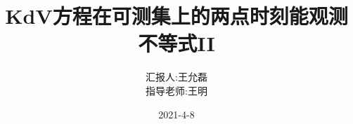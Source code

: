 \documentclass[xcolor=svgnames,serif,table,10pt]{beamer}
\title{KdV方程在可测集上的两点时刻能观测不等式II}
\institute[CUG]{\texttt{[image: cug.jpeg]}}
\author[王允磊]
{汇报人:王允磊\\
  指导老师:王明}
\date{\tiny 2021-4-8}
\begin{document}
\setlength{\abovedisplayskip}{1ex}%
\setlength{\belowdisplayskip}{1ex}%


\begin{frame}
  \titlepage
\end{frame}




\end{document}
